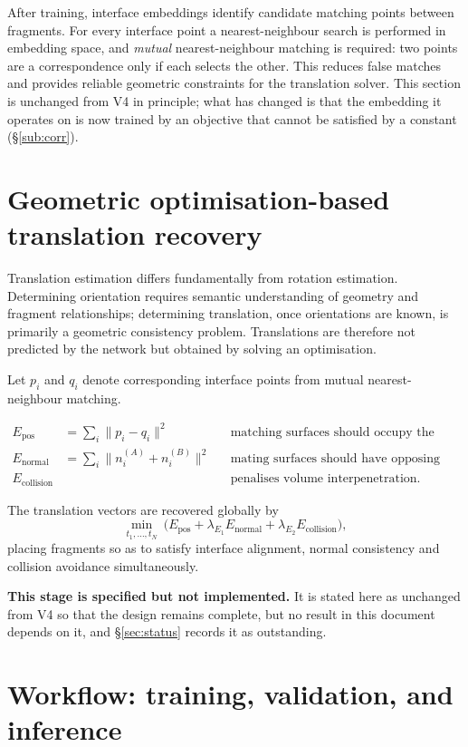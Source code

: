\documentclass[11pt,a4paper]{report}
\begin{document}
After training, interface embeddings identify candidate matching points between
fragments. For every interface point a nearest-neighbour search is performed in
embedding space, and \emph{mutual} nearest-neighbour matching is required: two
points are a correspondence only if each selects the other. This reduces false
matches and provides reliable geometric constraints for the translation solver.
This section is unchanged from V4 in principle; what has changed is that the
embedding it operates on is now trained by an objective that cannot be satisfied
by a constant (\S\ref{sub:corr}).

\section{Geometric optimisation-based translation recovery}
\label{sec:translation}

Translation estimation differs fundamentally from rotation estimation.
Determining orientation requires semantic understanding of geometry and
fragment relationships; determining translation, once orientations are known, is
primarily a geometric consistency problem. Translations are therefore not
predicted by the network but obtained by solving an optimisation.

Let $p_i$ and $q_i$ denote corresponding interface points from mutual
nearest-neighbour matching.

\begin{align*}
E_{\text{pos}} &= \sum_i \lVert p_i - q_i \rVert^2
&&\text{matching surfaces should occupy the same locations,}\\
E_{\text{normal}} &= \sum_i \lVert n^{(A)}_i + n^{(B)}_i \rVert^2
&&\text{mating surfaces should have opposing normals,}\\
E_{\text{collision}} &&&\text{penalises volume interpenetration.}
\end{align*}

The translation vectors are recovered globally by
\[
\min_{t_1,\ldots,t_N}\ \Big( E_{\text{pos}} + \lambda_{E_1} E_{\text{normal}}
+ \lambda_{E_2} E_{\text{collision}} \Big),
\]
placing fragments so as to satisfy interface alignment, normal consistency and
collision avoidance simultaneously.

\textbf{This stage is specified but not implemented.} It is stated here as
unchanged from V4 so that the design remains complete, but no result in this
document depends on it, and \S\ref{sec:status} records it as outstanding.

\section{Workflow: training, validation, and inference}
\label{sec:workflow}
\end{document}
